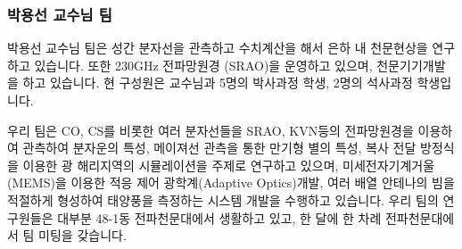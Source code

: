 \subsubsection{박용선 교수님 팀}
박용선 교수님 팀은 성간 분자선을 관측하고 수치계산을 해서 은하 내 천문현상을 연구하고 있습니다. 또한  230GHz 전파망원경 (SRAO)을 운영하고 있으며, 천문기기개발을 하고 있습니다. 현 구성원은 교수님과 5명의 박사과정 학생, 2명의 석사과정 학생입니다.

우리 팀은 CO, CS를 비롯한 여러 분자선들을 SRAO, KVN등의 전파망원경을 이용하여 관측하여 분자운의 특성, 메이져선 관측을 통한 만기형 별의 특성, 복사 전달 방정식을 이용한 광 해리지역의 시뮬레이션을 주제로 연구하고 있으며, 미세전자기계거울(MEMS)을 이용한 적응 제어 광학계(Adaptive Optics)개발, 여러 배열 안테나의 빔을 적절하게 형성하여 태양풍을 측정하는 시스템 개발을 수행하고 있습니다. 우리 팀의 연구원들은 대부분 48-1동 전파천문대에서 생활하고 있고, 한 달에 한 차례 전파천문대에서 팀 미팅을 갖습니다.

